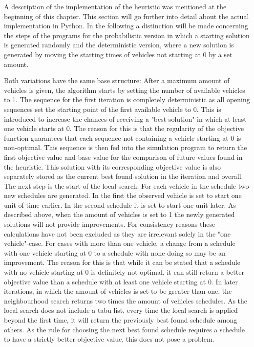 A description of the implementation of the heuristic was mentioned at the beginning of this chapter. This section will go further into detail about
the actual implementation in Python. In the following a distinction will be made concerning the steps of the programs for the probabilistic version
in which a starting solution is generated randomly and the deterministic version, where a new solution is generated by moving the starting times
of vehicles not starting at 0 by a set amount.

Both variations have the same base structure: After a maximum amount of vehicles is given, the algorithm starts by setting the number of available
vehicles to 1. The sequence for the first iteration is completely deterministic as all opening sequences set the starting point of the first available
vehicle to 0. This is introduced to increase the chances of receiving a "best solution" in which at least one vehicle starts at 0. The reason for this is
that the regularity of the objective function guarantees that each sequence not containing a vehicle starting at 0 is non-optimal.
This sequence is then fed into the simulation program to return the first objective value and base value for the comparison of future values found in the heuristic. This solution with its corresponding objective
value is also separately stored as the current best found solution in the iteration and overall. The next step is the start of the local search:
For each vehicle in the schedule two new schedules are generated. In the first the observed vehicle is set to start one unit of time earlier. In
the second schedule it is set to start one unit later. As described above, when the amount of vehicles is set to 1 the newly generated solutions
will not provide improvements. For consistency reasons these calculations have not been excluded as they are irrelevant solely in the "one vehicle"-case.
For cases with more than one vehicle, a change from a schedule with one vehicle starting at 0 to a schedule with none doing so may be an improvement.
The reason for this is that while it can be stated that a schedule with no vehicle starting at 0 is definitely not optimal, it can still return a better
objective value than a schedule with at least one vehicle starting at 0. In later iterations, in which the amount of vehicles is set to be greater than
one, the neighbourhood search returns two times the amount of vehicles schedules. As the local search does not include a tabu list, every time the
local search is applied beyond the first time, it will return the previously best found schedule among others. As the rule for choosing the next best
found schedule requires a schedule to have a strictly better objective value, this does not pose a problem.

